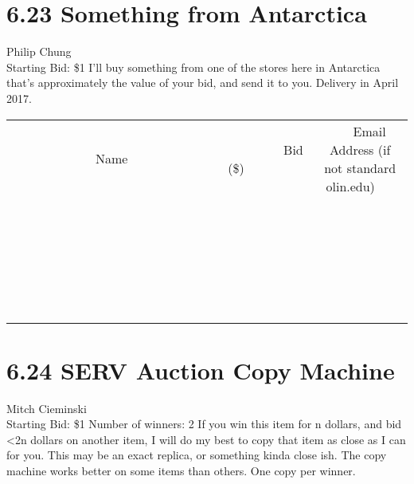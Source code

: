 \documentclass[11pt]{article}
\begin{document}
\section*{6.23 Something from Antarctica}
Philip Chung
\\
Starting Bid: \$1
\newline
I'll buy something from one of the stores here in Antarctica that's approximately the value of your bid, and send it to you. Delivery in April 2017.
\\[6ex]
\begin{tabular}{c c c}
~~~~~~~~~~~~~Name~~~~~~~~~~~~~ & ~~~~~~~~~Bid (\$)~~~~~~~~~  & ~~~Email Address (if not standard olin.edu)~~~\\
 & & \\
\hline
 & & \\
\hline
 & & \\
\hline
 & & \\
\hline
 & & \\
\hline
 & & \\
\hline
 & & \\
\hline
 & & \\
\hline
 & & \\
\hline
 & & \\
\hline
 & & \\
\hline
 & & \\
\hline
 & & \\
\hline
 & & \\
\hline
 & & \\
\hline
 & & \\
\hline
 & & \\
\hline
 & & \\
\hline
 & & \\
\hline
 & & \\
\hline
 & & \\
\hline
 & & \\
\hline
 & & \\
\hline
 & & \\
\hline
 & & \\
\hline
 & & \\
\hline
\end{tabular}
\newpage
\section*{6.24 SERV Auction Copy Machine}
Mitch Cieminski
\\
Starting Bid: \$1
\newline
Number of winners: 2
\newline
If you win this item for n dollars, and bid \textless 2n dollars on another item, I will do my best to copy that item as close as I can for you. This may be an exact replica, or something kinda close ish. The copy machine works better on some items than others. One copy per winner.
\end{document}
